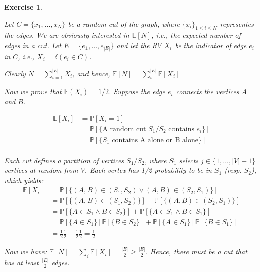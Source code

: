 \documentclass{article}
\newtheorem{exo}{Exercise}
\def\P{\mathbb{P}}
\def\E{\mathbb{E}}
\begin{document}
\begin{exo}{\ \\}

Let $C = \{x_1, \dots, x_N\}$ be a random cut of the graph, where $\{x_i\}_{1\leq i \leq N}$ representes the edges. We are obviously interested in $\E[N]$, i.e., the expected number of edges in a cut. Let $E = \{e_1, \dots, e_{|E|}\}$ and let the RV $X_i$ be the indicator of edge $e_i$ in $C$, i.e., $X_i = \delta(e_i \in C)$.


Clearly $\displaystyle N = \sum_{i=1}^{|E|}X_i$, and hence, $\displaystyle \E[N]= \sum_i^{|E|} \E[X_i]$

Now we prove that $\E (X_i) = 1/2$. Suppose the edge $e_i$ connects the vertices $A$ and $B$. 

\begin{align*}
    \E[X_i] &= \P[X_i=1] \\
            &= \P[\{\text{A random cut $S_1/S_2$ contains $e_i$}\}] \\
            &= \P[\{\text{$S_1$ contains A alone or B alone}\}] \\
\end{align*}

Each cut defines a partition of vertices $S_1 / S_2$, where $S_1$ selects $j \in \{1, \dots, |V|-1\}$ vertices at random from $V$. Each vertex has 1/2 probability to be in $S_1$ (resp. $S_2$), which yields:
\begin{align*}
    \E[X_i] &= \P[\{ (A,B)\in (S_1, S_2) \lor (A,B)\in (S_2, S_1)\}]  \\
            &= \P[\{ (A,B)\in (S_1, S_2)\}] + \P[\{(A,B)\in (S_2, S_1)\}] \\
            &= \P[\{ A \in S_1 \land B \in S_2 \}] + \P[\{  A \in S_1 \land B \in S_1\}] \\
            &= \P[\{ A \in S_1\}]\P[\{ B \in S_2 \}] + \P[\{A \in S_1\}] \P[\{B \in S_1\}] \\
            &=  \frac{1}{2} \frac{1}{2}+  \frac{1}{2} \frac{1}{2}  =  \frac{1}{2}
\end{align*}

Now we have: $\E[N] = \sum_i \E[X_i] = \frac{|E|}{2} \geq \frac{|E|}{2}$. Hence, there must be a cut that has at least $\frac{|E|}{2}$ edges.

\end{exo}
\end{document}
